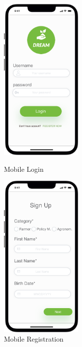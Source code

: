 \begin{figure}[H]
  \centering
  \begin{minipage}{0.4\textwidth}
    \includegraphics[width=40mm,scale=0.9]{./Images//Mocks/Mobile/Login.png}
    \caption{Mobile Login}
   \end{minipage}
   \hfill
   \begin{minipage}{0.4\textwidth}
     \includegraphics[width=40mm,scale=0.9]{./Images//Mocks/Mobile/Registration.png}
     \caption{Mobile Registration}
   \end{minipage}
\end{figure}


